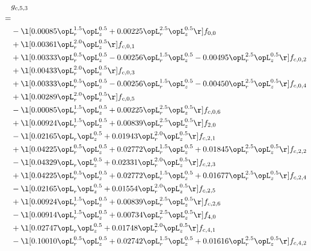 \begin{alignat}{2} 
\label{eq:g_53_0} 
& g_{c,5,3} \nonumber \\ 
 = \\ 
& - \l[  0.00085 \opL_r^{1.5} \opL_z^{0.5} +  0.00225 \opL_r^{2.5} \opL_z^{0.5}  \r] f_{0,0} \nonumber \\ 
& + \l[  0.00361 \opL_r^{2.0} \opL_z^{0.5}  \r] f_{c,0,1} \nonumber \\ 
& + \l[  0.00333 \opL_r^{0.5} \opL_z^{0.5}   -0.00256 \opL_r^{1.5} \opL_z^{0.5}   -0.00495 \opL_r^{2.5} \opL_z^{0.5}  \r] f_{c,0,2} \nonumber \\ 
& + \l[  0.00433 \opL_r^{2.0} \opL_z^{0.5}  \r] f_{c,0,3} \nonumber \\ 
& + \l[  0.00333 \opL_r^{0.5} \opL_z^{0.5}   -0.00256 \opL_r^{1.5} \opL_z^{0.5}   -0.00450 \opL_r^{2.5} \opL_z^{0.5}  \r] f_{c,0,4} \nonumber \\ 
& + \l[  0.00289 \opL_r^{2.0} \opL_z^{0.5}  \r] f_{c,0,5} \nonumber \\ 
& - \l[  0.00085 \opL_r^{1.5} \opL_z^{0.5} +  0.00225 \opL_r^{2.5} \opL_z^{0.5}  \r] f_{c,0,6} \nonumber \\ 
& + \l[  0.00924 \opL_r^{1.5} \opL_z^{0.5} +  0.00839 \opL_r^{2.5} \opL_z^{0.5}  \r] f_{2,0} \nonumber \\ 
& - \l[  0.02165 \opL_r \opL_z^{0.5} +  0.01943 \opL_r^{2.0} \opL_z^{0.5}  \r] f_{c,2,1} \nonumber \\ 
& + \l[  0.04225 \opL_r^{0.5} \opL_z^{0.5} +  0.02772 \opL_r^{1.5} \opL_z^{0.5} +  0.01845 \opL_r^{2.5} \opL_z^{0.5}  \r] f_{c,2,2} \nonumber \\ 
& - \l[  0.04329 \opL_r \opL_z^{0.5} +  0.02331 \opL_r^{2.0} \opL_z^{0.5}  \r] f_{c,2,3} \nonumber \\ 
& + \l[  0.04225 \opL_r^{0.5} \opL_z^{0.5} +  0.02772 \opL_r^{1.5} \opL_z^{0.5} +  0.01677 \opL_r^{2.5} \opL_z^{0.5}  \r] f_{c,2,4} \nonumber \\ 
& - \l[  0.02165 \opL_r \opL_z^{0.5} +  0.01554 \opL_r^{2.0} \opL_z^{0.5}  \r] f_{c,2,5} \nonumber \\ 
& + \l[  0.00924 \opL_r^{1.5} \opL_z^{0.5} +  0.00839 \opL_r^{2.5} \opL_z^{0.5}  \r] f_{c,2,6} \nonumber \\ 
& - \l[  0.00914 \opL_r^{1.5} \opL_z^{0.5} +  0.00734 \opL_r^{2.5} \opL_z^{0.5}  \r] f_{4,0} \nonumber \\ 
& + \l[  0.02747 \opL_r \opL_z^{0.5} +  0.01748 \opL_r^{2.0} \opL_z^{0.5}  \r] f_{c,4,1} \nonumber \\ 
& - \l[  0.10010 \opL_r^{0.5} \opL_z^{0.5} +  0.02742 \opL_r^{1.5} \opL_z^{0.5} +  0.01616 \opL_r^{2.5} \opL_z^{0.5}  \r] f_{c,4,2} \nonumber \\ 

\end{alignat}
